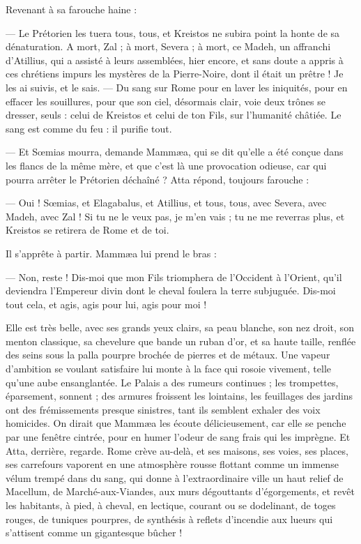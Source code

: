 \documentclass[a4paper, 11pt, oneside, polutonikogreek, french]{article}
\begin{document}
Revenant à sa farouche haine :

--- Le Prétorien les tuera tous, tous, et Kreistos ne subira point la honte de sa dénaturation. A mort, Zal ; à mort, Severa ; à mort, ce Madeh, un affranchi d'Atillius, qui a assisté à leurs assemblées, hier encore, et sans doute a appris à ces chrétiens impurs les mystères de la Pierre-Noire, dont il était un prêtre ! Je les ai suivis, et le sais. --- Du sang sur Rome pour en laver les iniquités, pour en effacer les souillures, pour que son ciel, désormais clair, voie deux trônes se dresser, seuls : celui de Kreistos et celui de ton Fils, sur l'humanité châtiée. Le sang est comme du feu : il purifie tout.

--- Et Sœmias mourra, demande Mammæa, qui se dit qu'elle a été conçue dans les flancs de la même mère, et que c'est là une provocation odieuse, car qui pourra arrêter le Prétorien déchaîné ? Atta répond, toujours farouche :

--- Oui ! Sœmias, et Elagabalus, et Atillius, et tous, tous, avec Severa, avec Madeh, avec Zal ! Si tu ne le veux pas, je m'en vais ; tu ne me reverras plus, et Kreistos se retirera de Rome et de toi.

Il s'apprête à partir. Mammæa lui prend le bras :

--- Non, reste ! Dis-moi que mon Fils triomphera de l'Occident à l'Orient, qu'il deviendra l'Empereur divin dont le cheval foulera la terre subjuguée. Dis-moi tout cela, et agis, agis pour lui, agis pour moi !

Elle est très belle, avec ses grands yeux clairs, sa peau blanche, son nez droit, son menton classique, sa chevelure que bande un ruban d'or, et sa haute taille, renflée des seins sous la palla pourpre brochée de pierres et de métaux. Une vapeur d'ambition se voulant satisfaire lui monte à la face qui rosoie vivement, telle qu'une aube ensanglantée. Le Palais a des rumeurs continues ; les trompettes, éparsement, sonnent ; des armures froissent les lointains, les feuillages des jardins ont des frémissements presque sinistres, tant ils semblent exhaler des voix homicides. On dirait que Mammæa les écoute délicieusement, car elle se penche par une fenêtre cintrée, pour en humer l'odeur de sang frais qui les imprègne. Et Atta, derrière, regarde. Rome crève au-delà, et ses maisons, ses voies, ses places, ses carrefours vaporent en une atmosphère rousse flottant comme un immense vélum trempé dans du sang, qui donne à l'extraordinaire ville un haut relief de Macellum, de Marché-aux-Viandes, aux murs dégouttants d'égorgements, et revêt les habitants, à pied, à cheval, en lectique, courant ou se dodelinant, de toges rouges, de tuniques pourpres, de synthésis à reflets d'incendie aux lueurs qui s'attisent comme un gigantesque bûcher !
\end{document}
